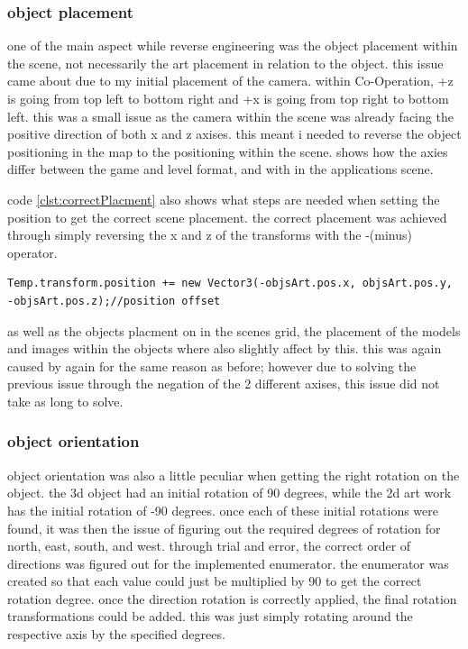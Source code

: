 \subsubsection{object placement}
one of the main aspect while reverse engineering was the object placement within the scene, not necessarily the art placement in relation to the object. this issue came about due to my initial placement of the camera. within Co-Operation, +z is going from top left to bottom right and +x is going from top right to bottom left. this was a small issue as the camera within the scene was already facing the positive direction of both x and z axises. this meant i needed to reverse the object positioning in the map to the positioning within the scene.  shows how the axies differ between the game and level format, and with in the applications scene.

code \ref{clst:correctPlacment} also shows what steps are needed when setting the position to get the correct scene placement. the correct placement was achieved through simply reversing the x and z of the transforms with the -(minus) operator.
\begin{lstlisting}[language={[Sharp]C}, caption=C\# code for correcting object placement from file to scene, label=clst:correctPlacment]
Temp.transform.position += new Vector3(-objsArt.pos.x, objsArt.pos.y, -objsArt.pos.z);//position offset
\end{lstlisting}

as well as the objects placment on in the scenes grid, the placement of the models and images within the objects where also slightly affect by this. this was again caused by again for the same reason as before; however due to solving the previous issue through the negation of the 2 different axises, this issue did not take as long to solve.

\subsubsection{object orientation}
object orientation was also a little peculiar when getting the right rotation on the object. the 3d object had an initial rotation of 90 degrees, while the 2d art work has the initial rotation of -90 degrees. once each of these initial rotations were found, it was then the issue of figuring out the required degrees of rotation for north, east, south, and west.  through trial and error, the correct order of directions was figured out for the implemented enumerator. the enumerator was created so that each value could just be multiplied by 90 to get the correct rotation degree. once the direction rotation is correctly applied, the final rotation transformations could be added. this was just simply rotating around the respective axis by the specified degrees.

